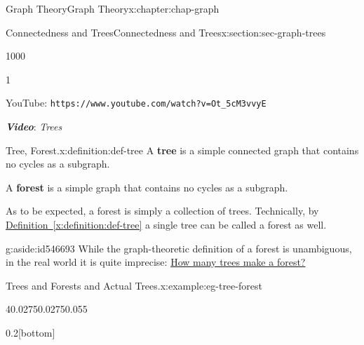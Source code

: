 \documentclass[oneside,10pt,]{book}
\newcommand{\xreffont}{\relax}
\newcommand{\mono}[1]{\texttt{#1}}
\newcommand{\alert}[1]{\textbf{\textit{#1}}}
\newcommand{\terminology}[1]{\textbf{#1}}
\numberwithin{equation}{section}
\newlength{\qrsize}
\begin{document}
\begin{chapterptx}{Graph Theory}{}{Graph Theory}{}{}{x:chapter:chap-graph}
\begin{sectionptx}{Connectedness and Trees}{}{Connectedness and Trees}{}{}{x:section:sec-graph-trees}
\begin{sidebyside}{1}{0}{0}{0}
\begin{sbspanel}{1}
\begin{tcbraster}[raster columns=2, raster column skip=1pt, raster halign=center, raster force size=false, raster left skip=0pt, raster right skip=0pt]
\begin{tcolorbox}[qrstyle]%
{\hypersetup{urlcolor=black}}%
\end{tcolorbox}%
\begin{tcolorbox}[captionstyle]%
\small YouTube: \mono{https://www.youtube.com/watch?v=Ot\_5cM3vvyE}\end{tcolorbox}%
\end{tcbraster}%
\end{sbspanel}%
\end{sidebyside}%
\par
\alert{Video}: \emph{Trees}%
\begin{definition}{Tree, Forest.}{x:definition:def-tree}%
A \terminology{tree} is a simple connected graph that contains no cycles as a subgraph.%
\par
A \terminology{forest} is a simple graph that contains no cycles as a subgraph.%
\end{definition}
As to be expected, a forest is simply a collection of trees. Technically, by \hyperref[x:definition:def-tree]{Definition~{\xreffont\ref{x:definition:def-tree}}} a single tree can be called a forest as well.%
\begin{aside}{}{g:aside:id546693}%
While the graph-theoretic definition of a forest is unambiguous, in the real world it is quite imprecise: \href{https://www.nature.org/en-us/what-we-do/our-insights/perspectives/how-many-trees-make-a-forest/}{How many trees make a forest?}%
\end{aside}
\begin{example}{Trees and Forests and Actual Trees.}{x:example:eg-tree-forest}%
\begin{sidebyside}{4}{0.0275}{0.0275}{0.055}%
\begin{sbspanel}{0.2}[bottom]%
\end{sbspanel}
\end{sidebyside}
\end{example}
\end{sectionptx}
\end{chapterptx}
\end{document}
